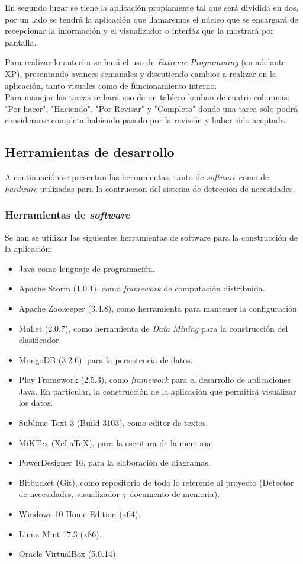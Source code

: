 En segundo lugar se tiene la aplicación propiamente tal que será dividida en dos, por un lado se tendrá la aplicación que llamaremos el núcleo que se encargará de recepcionar la información y el visualizador o interfáz que la mostrará por pantalla.

Para realizar lo anterior se hará el uso de \textit{Extreme Programming} (en adelante XP), presentando avances semanales y discutiendo cambios a realizar en la aplicación, tanto visuales como de funcionamiento interno.\\

Para manejar las tareas se hará uso de un tablero kanban de cuatro columnas: "Por hacer", "Haciendo", "Por Revisar" y "Completo" donde una tarea sólo podrá considerarse completa habiendo pasado por la revisión y haber sido aceptada.

\subsection{Herramientas de desarrollo}
\label{subsec:HerrDesarrollo}

A continuación se presentan las herramientas, tanto de \textit{software} como de \textit{hardware} utilizadas para la contrucción del sistema de detección de necesidades.

\subsubsection{Herramientas de \textit{software}}
\label{subsubsec:HerrSoftware}

Se han se utilizar las siguientes herramientas de software para la construcción de la aplicación:

\begin{itemize}
\item Java como lenguaje de programación.
\item Apache Storm (1.0.1), como \textit{framework} de computación distribuida.
\item Apache Zookeeper (3.4.8), como herramienta para mantener la configuración
\item Mallet (2.0.7), como herramienta de \textit{Data Mining} para la construcción del clasificador.
\item MongoDB (3.2.6), para la persistencia de datos.
\item Play Framework (2.5.3), como \textit{framework} para el desarrollo de aplicaciones Java. En particular, la construcción de la aplicación que permitirá visualizar los datos. 
\item Sublime Text 3 (Build 3103), como editor de textos.
\item MiKTex (XeLaTeX), para la escritura de la memoria.
\item PowerDesigner 16, para la elaboración de diagramas.
\item Bitbucket (Git), como repositorio de todo lo referente al proyecto (Detector de necesidades, visualizador y documento de memoria).
\item Windows 10 Home Edition (x64).
\item Linux Mint 17.3 (x86).
\item Oracle VirtualBox (5.0.14).
\end{itemize}

